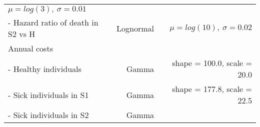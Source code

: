 \documentclass[
]{article}
\begin{document}
\begin{longtable}[]{@{}lrr@{}}
\begin{minipage}[t]{0.42\columnwidth}
\(\mu = log(3), \ \sigma = 0.01\)\strut
\end{minipage}\tabularnewline
\begin{minipage}[t]{0.32\columnwidth}\raggedright
- Hazard ratio of death in S2 vs H\strut
\end{minipage} & \begin{minipage}[t]{0.17\columnwidth}\raggedleft
Lognormal\strut
\end{minipage} & \begin{minipage}[t]{0.42\columnwidth}\raggedleft
\(\mu = log(10), \ \sigma = 0.02\)\strut
\end{minipage}\tabularnewline
\begin{minipage}[t]{0.32\columnwidth}\raggedright
Annual costs\strut
\end{minipage} & \begin{minipage}[t]{0.17\columnwidth}\raggedleft
\strut
\end{minipage} & \begin{minipage}[t]{0.42\columnwidth}\raggedleft
\strut
\end{minipage}\tabularnewline
\begin{minipage}[t]{0.32\columnwidth}\raggedright
- Healthy individuals\strut
\end{minipage} & \begin{minipage}[t]{0.17\columnwidth}\raggedleft
Gamma\strut
\end{minipage} & \begin{minipage}[t]{0.42\columnwidth}\raggedleft
shape = 100.0, scale = 20.0\strut
\end{minipage}\tabularnewline
\begin{minipage}[t]{0.32\columnwidth}\raggedright
- Sick individuals in S1\strut
\end{minipage} & \begin{minipage}[t]{0.17\columnwidth}\raggedleft
Gamma\strut
\end{minipage} & \begin{minipage}[t]{0.42\columnwidth}\raggedleft
shape = 177.8, scale = 22.5\strut
\end{minipage}\tabularnewline
\begin{minipage}[t]{0.32\columnwidth}\raggedright
- Sick individuals in S2\strut
\end{minipage} & \begin{minipage}[t]{0.17\columnwidth}\raggedleft
Gamma\strut
\end{minipage} & \begin{minipage}[t]{0.42\columnwidth}\raggedleft

\end{minipage}
\end{longtable}
\end{document}
